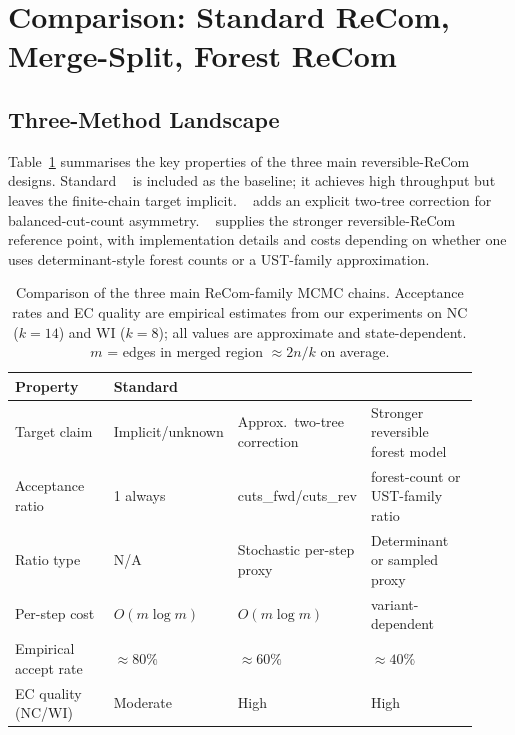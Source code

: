 \section{Comparison: Standard ReCom, Merge-Split, Forest ReCom}
\label{sec:comparison}

\subsection{Three-Method Landscape}

Table~\ref{tab:comparison} summarises the key properties of the three
main reversible-ReCom designs.
Standard \recom{}~\citep{deford2021} is included as the baseline; it
achieves high throughput but leaves the finite-chain target implicit.
\mergesplit{}~\citep{janson2022} adds an explicit two-tree correction for
balanced-cut-count asymmetry.
\forestrecom{}~\citep{mccartan2020,dellaLibera2026forestRecom} supplies the
stronger reversible-ReCom reference point, with implementation details and
costs depending on whether one uses determinant-style forest counts or a
UST-family approximation.

\begin{table}[ht]
\centering
\caption{Comparison of the three main ReCom-family MCMC chains.
  Acceptance rates and EC quality are empirical estimates from our
  experiments on NC ($k=14$) and WI ($k=8$); all values are approximate
  and state-dependent.
  $m$ = edges in merged region $\approx 2n/k$ on average.}
\label{tab:comparison}
\renewcommand{\arraystretch}{1.35}
\small
\begin{tabular}{@{}p{0.22\linewidth}p{0.22\linewidth}p{0.24\linewidth}p{0.24\linewidth}@{}}
\toprule
Property & Standard \recom{} & \mergesplit{} & \forestrecom{} \\
\midrule
Target claim
  & Implicit/unknown
  & Approx.\ two-tree correction
  & Stronger reversible forest model \\
Acceptance ratio
  & 1 always
  & cuts\_fwd/cuts\_rev
  & forest-count or UST-family ratio \\
Ratio type
  & N/A
  & Stochastic per-step proxy
  & Determinant or sampled proxy \\
Per-step cost
  & $O(m \log m)$
  & $O(m \log m)$
  & variant-dependent \\
Empirical accept rate
  & $\approx\!80\%$
  & $\approx\!60\%$
  & $\approx\!40\%$ \\
EC quality (NC/WI)
  & Moderate
  & High
  & High \\
\bottomrule
\end{tabular}
\end{table}

